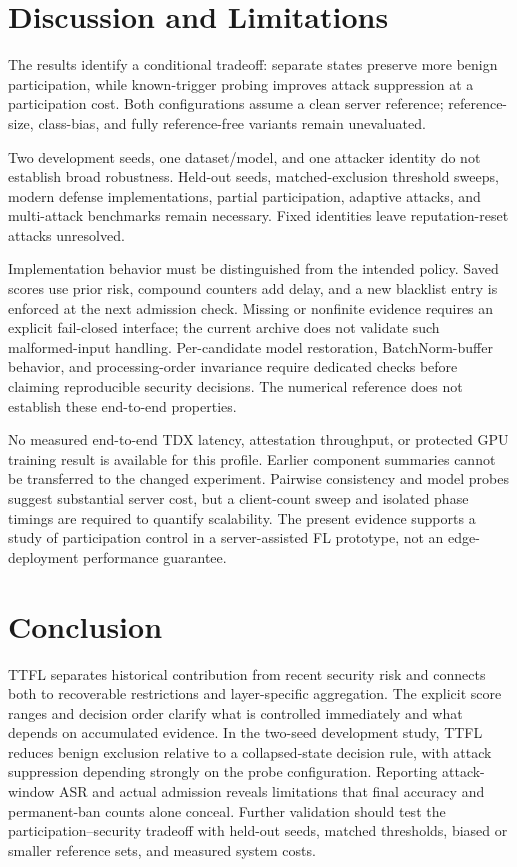 \documentclass[conference,compsoc]{IEEEtran}
\begin{document}
\FloatBarrier
\section{Discussion and Limitations}
The results identify a conditional tradeoff: separate states preserve more benign participation, while known-trigger probing improves attack suppression at a participation cost. Both configurations assume a clean server reference; reference-size, class-bias, and fully reference-free variants remain unevaluated.

Two development seeds, one dataset/model, and one attacker identity do not establish broad robustness. Held-out seeds, matched-exclusion threshold sweeps, modern defense implementations, partial participation, adaptive attacks, and multi-attack benchmarks remain necessary. Fixed identities leave reputation-reset attacks unresolved.

Implementation behavior must be distinguished from the intended policy. Saved scores use prior risk, compound counters add delay, and a new blacklist entry is enforced at the next admission check. Missing or nonfinite evidence requires an explicit fail-closed interface; the current archive does not validate such malformed-input handling. Per-candidate model restoration, BatchNorm-buffer behavior, and processing-order invariance require dedicated checks before claiming reproducible security decisions. The numerical reference does not establish these end-to-end properties.

No measured end-to-end TDX latency, attestation throughput, or protected GPU training result is available for this profile. Earlier component summaries cannot be transferred to the changed experiment. Pairwise consistency and model probes suggest substantial server cost, but a client-count sweep and isolated phase timings are required to quantify scalability. The present evidence supports a study of participation control in a server-assisted FL prototype, not an edge-deployment performance guarantee.

\section{Conclusion}
TTFL separates historical contribution from recent security risk and connects both to recoverable restrictions and layer-specific aggregation. The explicit score ranges and decision order clarify what is controlled immediately and what depends on accumulated evidence. In the two-seed development study, TTFL reduces benign exclusion relative to a collapsed-state decision rule, with attack suppression depending strongly on the probe configuration. Reporting attack-window ASR and actual admission reveals limitations that final accuracy and permanent-ban counts alone conceal. Further validation should test the participation--security tradeoff with held-out seeds, matched thresholds, biased or smaller reference sets, and measured system costs.
\end{document}
